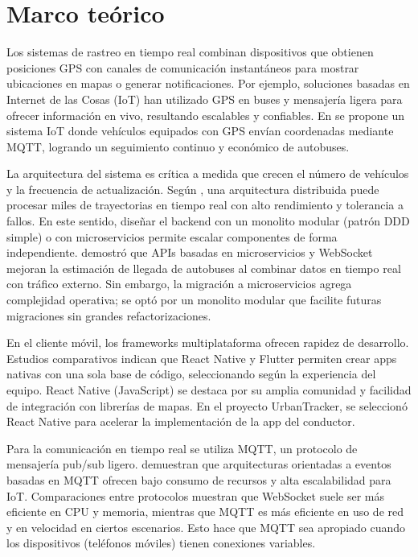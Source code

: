 \section{Marco teórico}
Los sistemas de rastreo en tiempo real combinan dispositivos que obtienen posiciones GPS con canales de comunicación instantáneos para mostrar ubicaciones en mapas o generar notificaciones. Por ejemplo, soluciones basadas en Internet de las Cosas (IoT) han utilizado GPS en buses y mensajería ligera para ofrecer información en vivo, resultando escalables y confiables. En \cite{karne2022iot} se propone un sistema IoT donde vehículos equipados con GPS envían coordenadas mediante MQTT, logrando un seguimiento continuo y económico de autobuses.

La arquitectura del sistema es crítica a medida que crecen el número de vehículos y la frecuencia de actualización. Según \cite{cervantes2022arquitectura}, una arquitectura distribuida puede procesar miles de trayectorias en tiempo real con alto rendimiento y tolerancia a fallos. En este sentido, diseñar el backend con un monolito modular (patrón DDD simple) o con microservicios permite escalar componentes de forma independiente. \cite{nugraha2023api} demostró que APIs basadas en microservicios y WebSocket mejoran la estimación de llegada de autobuses al combinar datos en tiempo real con tráfico externo. Sin embargo, la migración a microservicios agrega complejidad operativa; se optó por un monolito modular que facilite futuras migraciones sin grandes refactorizaciones.

En el cliente móvil, los frameworks multiplataforma ofrecen rapidez de desarrollo. Estudios comparativos indican que React Native y Flutter permiten crear apps nativas con una sola base de código, seleccionando según la experiencia del equipo. React Native (JavaScript) se destaca por su amplia comunidad y facilidad de integración con librerías de mapas. En el proyecto UrbanTracker, se seleccionó React Native para acelerar la implementación de la app del conductor.

Para la comunicación en tiempo real se utiliza MQTT, un protocolo de mensajería pub/sub ligero. \cite{villagra2021mqtt} demuestran que arquitecturas orientadas a eventos basadas en MQTT ofrecen bajo consumo de recursos y alta escalabilidad para IoT. Comparaciones entre protocolos muestran que WebSocket suele ser más eficiente en CPU y memoria, mientras que MQTT es más eficiente en uso de red y en velocidad en ciertos escenarios. Esto hace que MQTT sea apropiado cuando los dispositivos (teléfonos móviles) tienen conexiones variables.

